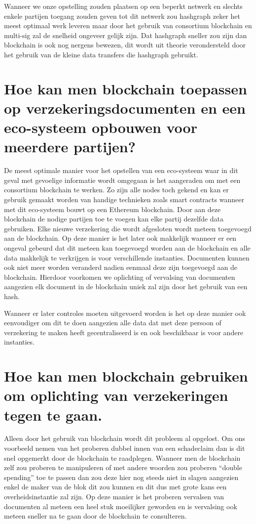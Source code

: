 Wanneer we onze opstelling zouden plaatsen op een beperkt netwerk en slechts enkele partijen toegang zouden geven tot dit netwerk zou hashgraph zeker het meest optimaal werk leveren maar door het gebruik van consortium blockchain en multi-sig zal de snelheid ongeveer gelijk zijn. Dat hashgraph sneller zou zijn dan blockchain is ook nog nergens bewezen, dit wordt uit theorie verondersteld door het gebruik van de kleine data transfers die hashgraph gebruikt. 

\section{Hoe kan men blockchain toepassen op verzekeringsdocumenten en een eco-systeem opbouwen voor meerdere partijen?}
De meest optimale manier voor het opstellen van een eco-systeem waar in dit geval met gevoelige informatie wordt omgegaan is het aangeraden om met een consortium blockchain te werken. Zo zijn alle nodes toch gekend en kan er gebruik gemaakt worden van handige technieken zoals smart contracts wanneer met dit eco-systeem bouwt op een Ethereum blockchain. Door aan deze blockchain de nodige partijen toe te voegen kan elke partij dezelfde data gebruiken. Elke nieuwe verzekering die wordt afgesloten wordt meteen toegevoegd aan de blockchain. Op deze manier is het later ook makkelijk wanneer er een ongeval gebeurd dat dit meteen kan toegevoegd worden aan de blockchain en alle data makkelijk te verkrijgen is voor verschillende instanties. Documenten kunnen ook niet meer worden veranderd nadien eenmaal deze zijn toegevoegd aan de blockchain. Hierdoor voorkomen we oplichting of vervalsing van documenten aangezien elk document in de blockchain uniek zal zijn door het gebruik van een hash.

Wanneer er later controles moeten uitgevoerd worden is het op deze manier ook eenvoudiger om dit te doen aangezien alle data dat met deze persoon of verzekering te maken heeft gecentraliseerd is en ook beschikbaar is voor andere instanties.

\section{Hoe kan men blockchain gebruiken om oplichting van verzekeringen tegen te gaan.}

Alleen door het gebruik van blockchain wordt dit probleem al opgelost. Om ons voorbeeld nemen van het proberen dubbel innen van een schadeclaim dan is dit snel opgemerkt door de blockchain te raadplegen. Wanneer men de blockchain zelf zou proberen te manipuleren of met andere woorden zou proberen ``double spending'' toe te passen dan zou deze hier nog steeds niet in slagen aangezien enkel de maker van de blok dit zou kunnen en dit dus met grote kans een overheidsinstantie zal zijn. Op deze manier is het proberen vervalsen van documenten al meteen een heel stuk moeilijker geworden en is vervalsing ook meteen sneller na te gaan door de blockchain te consulteren.




